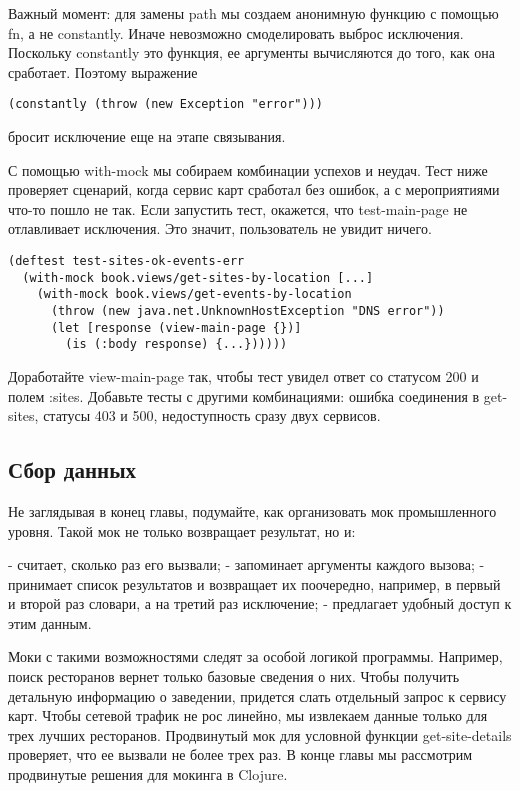 Важный момент: для замены path мы создаем анонимную функцию с помощью fn, а не
constantly. Иначе невозможно смоделировать выброс исключения. Поскольку
constantly это функция, ее аргументы вычисляются до того, как она
сработает. Поэтому выражение

\begin{verbatim}
(constantly (throw (new Exception "error")))
\end{verbatim}

бросит исключение еще на этапе связывания.

С помощью with-mock мы собираем комбинации успехов и неудач. Тест ниже проверяет
сценарий, когда сервис карт сработал без ошибок, а с мероприятиями что-то пошло
не так. Если запустить тест, окажется, что test-main-page не отлавливает
исключения. Это значит, пользователь не увидит ничего.

\begin{verbatim}
(deftest test-sites-ok-events-err
  (with-mock book.views/get-sites-by-location [...]
    (with-mock book.views/get-events-by-location
      (throw (new java.net.UnknownHostException "DNS error"))
      (let [response (view-main-page {})]
        (is (:body response) {...})))))
\end{verbatim}

Доработайте view-main-page так, чтобы тест увидел ответ со статусом 200 и полем
:sites. Добавьте тесты с другими комбинациями: ошибка соединения в get-sites,
статусы 403 и 500, недоступность сразу двух сервисов.

\subsection{Сбор данных}

Не заглядывая в конец главы, подумайте, как организовать мок промышленного
уровня. Такой мок не только возвращает результат, но и:

- считает, сколько раз его вызвали;
- запоминает аргументы каждого вызова;
- принимает список результатов и возвращает их поочередно, например, в первый и
  второй раз словари, а на третий раз исключение;
- предлагает удобный доступ к этим данным.

Моки с такими возможностями следят за особой логикой программы. Например, поиск
ресторанов вернет только базовые сведения о них. Чтобы получить детальную
информацию о заведении, придется слать отдельный запрос к сервису карт. Чтобы
сетевой трафик не рос линейно, мы извлекаем данные только для трех лучших
ресторанов. Продвинутый мок для условной функции get-site-details проверяет, что
ее вызвали не более трех раз. В конце главы мы рассмотрим продвинутые решения
для мокинга в Clojure.

